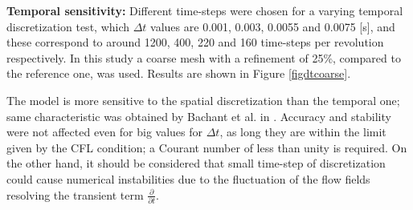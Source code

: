 \documentclass[a4paper]{jpconf}
\begin{document}
\textbf{Temporal sensitivity:} Different time-steps were chosen for a varying temporal discretization test, which $\Delta t$ values are 0.001, 0.003, 0.0055 and 0.0075 [s], and these correspond to around 1200, 400, 220 and 160 time-steps per revolution respectively. In this study a coarse mesh with a refinement of 25\%, compared to the reference one, was used. Results are shown in Figure \ref{figdtcoarse}. 

The model is more sensitive to the spatial discretization than the temporal one; same characteristic was obtained by Bachant et al. in \cite{Bachant2016-VAT-ALM}. Accuracy and stability were not affected even for big values for $\Delta t$, as long they are within the limit given by the CFL condition; a Courant number of less than unity is required. On the other hand, it should be considered that small time-step of discretization could cause numerical instabilities due to the fluctuation of the flow fields resolving the transient term $\frac{\partial}{\partial t}$.
\end{document}
